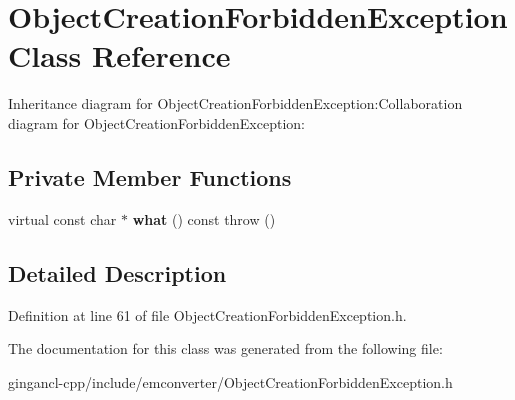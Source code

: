 \section{ObjectCreationForbiddenException Class Reference}
\label{classbr_1_1pucrio_1_1telemidia_1_1ginga_1_1ncl_1_1emconverter_1_1ObjectCreationForbiddenException}
Inheritance diagram for ObjectCreationForbiddenException:Collaboration diagram for ObjectCreationForbiddenException:\subsection*{Private Member Functions}
\begin{CompactItemize}
\item 
virtual const char $\ast$ {\bf what} () const  throw ()\label{classbr_1_1pucrio_1_1telemidia_1_1ginga_1_1ncl_1_1emconverter_1_1ObjectCreationForbiddenException_d62489809e3df568e973597b928d6d9b}

\end{CompactItemize}


\subsection{Detailed Description}




Definition at line 61 of file ObjectCreationForbiddenException.h.

The documentation for this class was generated from the following file:\begin{CompactItemize}
\item 
gingancl-cpp/include/emconverter/ObjectCreationForbiddenException.h\end{CompactItemize}
